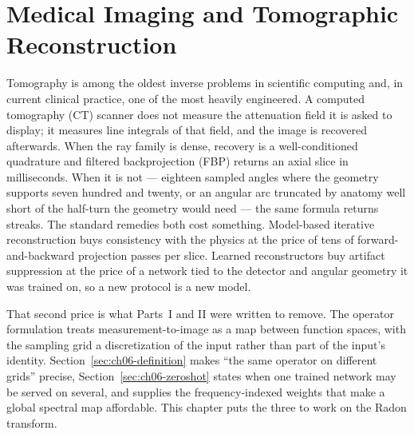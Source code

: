 
\chapter{Medical Imaging and Tomographic Reconstruction}
\label{ch:part3-medical-imaging-and-tomographic-reconstruc}
\label{sec:medical_imaging}

Tomography is among the oldest inverse problems in scientific computing and, in
current clinical practice, one of the most heavily engineered. A computed tomography
(CT) scanner does not measure the attenuation
field it is asked to display; it measures line integrals of that field, and the
image is recovered afterwards. When the ray family is dense, recovery is a
well-conditioned quadrature and filtered backprojection (FBP) returns an axial slice in milliseconds. When it is not ---
eighteen sampled angles where the geometry supports seven hundred and twenty, or
an angular arc truncated by anatomy well short of the half-turn the geometry
would need --- the same formula returns
streaks. The standard remedies both cost something.
Model-based iterative reconstruction buys consistency with the physics at the
price of tens of forward-and-backward projection passes per slice. Learned
reconstructors buy artifact suppression at the price of a network tied to the
detector and angular geometry it was trained on, so a new protocol is a new
model.

That second price is what Parts~I and II were written to remove. The operator
formulation treats measurement-to-image as a map between function spaces, with
the sampling grid a discretization of the input rather than part of the input's
identity. Section~\ref{sec:ch06-definition} makes ``the same operator on
different grids'' precise, Section~\ref{sec:ch06-zeroshot} states when one
trained network may be served on several, and
 supplies the
frequency-indexed weights that make a global spectral map affordable. This
chapter puts the three to work on the Radon transform.

